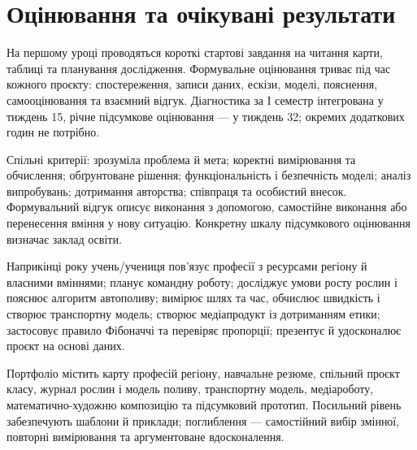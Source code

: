 \documentclass[10pt,a4paper,landscape]{article}
\begin{document}
\section*{Оцінювання та очікувані результати}
На першому уроці проводяться короткі стартові завдання на читання карти, таблиці та планування дослідження. Формувальне оцінювання триває під час кожного проєкту: спостереження, записи даних, ескізи, моделі, пояснення, самооцінювання та взаємний відгук. Діагностика за І семестр інтегрована у тиждень 15, річне підсумкове оцінювання — у тиждень 32; окремих додаткових годин не потрібно.

Спільні критерії: зрозуміла проблема й мета; коректні вимірювання та обчислення; обґрунтоване рішення; функціональність і безпечність моделі; аналіз випробувань; дотримання авторства; співпраця та особистий внесок. Формувальний відгук описує виконання з допомогою, самостійне виконання або перенесення вміння у нову ситуацію. Конкретну шкалу підсумкового оцінювання визначає заклад освіти.

Наприкінці року учень/учениця пов’язує професії з ресурсами регіону й власними вміннями; планує командну роботу; досліджує умови росту рослин і пояснює алгоритм автополиву; вимірює шлях та час, обчислює швидкість і створює транспортну модель; створює медіапродукт із дотриманням етики; застосовує правило Фібоначчі та перевіряє пропорції; презентує й удосконалює проєкт на основі даних.

Портфоліо містить карту професій регіону, навчальне резюме, спільний проєкт класу, журнал рослин і модель поливу, транспортну модель, медіароботу, математично-художню композицію та підсумковий прототип. Посильний рівень забезпечують шаблони й приклади; поглиблення — самостійний вибір змінної, повторні вимірювання та аргументоване вдосконалення.
\newpage
\end{document}
